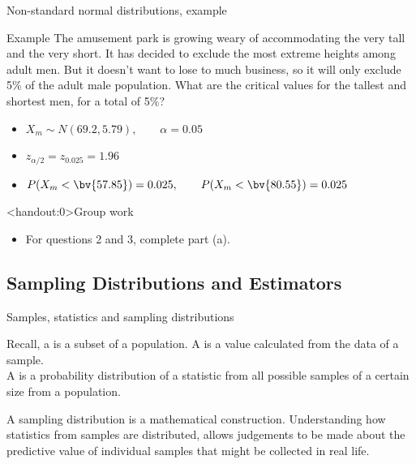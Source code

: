 \documentclass[xcolor=table, handout]{beamer}
\begin{document}
\begin{frame}{Non-standard normal distributions, example}
\begin{exampleblock}{Example}
The amusement park is growing weary of accommodating the very tall and the very short. It has decided to exclude the most extreme heights among adult men. But it doesn't want to lose to much business, so it will only exclude 5\% of the adult male population. What are the critical values for the tallest and shortest men, for a total of 5\%?
\begin{itemize} 
\pause\item $X_m \sim N(69.2, 5.79), \qquad \alpha = 0.05$
\pause\item $z_{\alpha/2} = z_{0.025} = 1.96$
\pause\item $P(X_m <  \bv{57.85}) = 0.025, \qquad P(X_m <  \bv{80.55}) = 0.025$
\end{itemize}

\end{exampleblock}
\end{frame}

\begin{frame}<handout:0>{Group work}
\begin{block}{}
\large
\begin{itemize}
\item For questions 2 and 3, complete part (a).
\end{itemize}
\end{block}
\end{frame}

\subsection{Sampling Distributions and Estimators}

\begin{frame}{Samples, statistics and sampling distributions}
\begin{block}{}
\large Recall, a  is a subset of a population. A  is a value calculated from the data of a sample.\\
\medskip
A  is a probability distribution of a statistic from all possible samples of a certain size from a population.
\end{block}

\pause
\begin{block}{}
A sampling distribution is a mathematical construction. Understanding how statistics from samples are distributed, allows judgements to be made about the predictive value of individual samples that might be collected in real life.
\end{block}
\end{frame}
\end{document}
